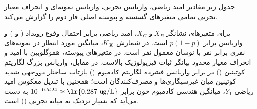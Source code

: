 \documentclass[12pt]{exam}
\begin{document}
جدول زیر مقادیر امید ریاضی، واریانس تجربی، واریانس نمونه‌ای و انحراف معیار تجربی تمامی متغیرهای گسسته و پیوسته اصلی فاز دوم را گزارش می‌کند.

\begin{table}[htbp]
\centering
\caption{امید ریاضی، واریانس تجربی، واریانس نمونه‌ای و انحراف معیار تجربی متغیرهای تصادفی گسسته و پیوسته}
\end{table}

برای متغیرهای نشانگر $X_B$ و $X_C$، امید ریاضی برابر احتمال وقوع رویداد ( و ) و واریانس برابر $p(1-p)$ است. در شمارش $K_{30}$، میانگین مورد انتظار در نمونه‌های  نفری برابر  نفر با نوسان معمول  نفر است. در متغیرهای پیوسته، هموگلوبین با امید  و انحراف معیار محدود  بیانگر ثبات فیزیولوژیک بالاست. در مقابل، واریانس بزرگ لگاریتم کوتینین () در برابر واریانس فشرده لگاریتم کادمیوم () بازتاب ساختار دووجهی شدید کوتینین میان غیرسیگاری‌ها و مصرف‌کنندگان است؛ همچنین با تبدیل معکوس امید ریاضی $Y_1$، میانگین هندسی کادمیوم خون برابر $10^{-0.5424} \approx \text{\lr{0.287 ug/L}}$ به دست می‌آید که بسیار نزدیک به میانه تجربی () است.
\end{document}
